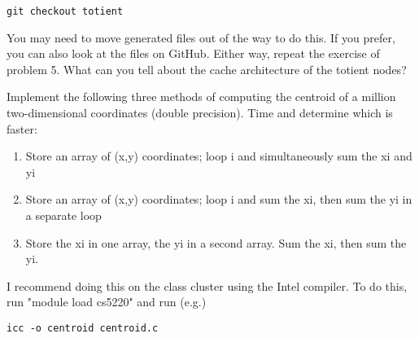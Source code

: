\documentclass{5220hw}
\begin{document}
\begin{exercises}
\begin{lstlisting}
git checkout totient
\end{lstlisting}

You may need to move generated files out of the way to do this. If you prefer, you can also look at the files on GitHub. Either way, repeat the exercise of problem 5.  What can you tell about the cache architecture of the totient nodes?

\item Implement the following three methods of computing the centroid of a million two-dimensional coordinates (double precision). Time and determine which is faster:

\begin{enumerate}
    \item  Store an array of (x,y) coordinates; loop i and simultaneously sum the xi and yi

    \item Store an array of (x,y) coordinates; loop i and sum the xi, then sum the yi in a separate loop

    \item Store the xi in one array, the yi in a second array. Sum the xi, then sum the yi.
\end{enumerate}

    I recommend doing this on the class cluster using the Intel compiler.  To do this, run "module load cs5220" and run (e.g.)
\begin{lstlisting}
icc -o centroid centroid.c
\end{lstlisting}

\end{exercises}
\end{document}
